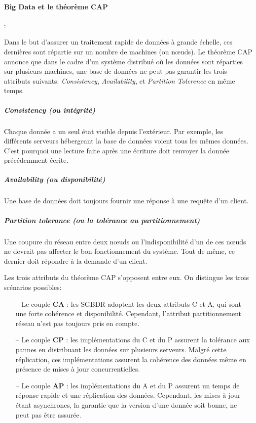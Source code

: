 		\paragraph{Big Data et le théorème  CAP} \label{par:cap-theorem}:
		
		Dans le but d'assurer un traitement rapide de données à grande échelle, ces dernières sont répartie sur un nombre de machines  (ou n\oe{}uds). Le théorème CAP annonce que dans le cadre d'un système distribué où les données sont réparties sur plusieurs machines,
		une base de données ne peut pas garantir les trois attributs suivants: \textit{Consistency}, \textit{Availability}, et \textit{Partition Tolerence}  en même temps. 
		
		
			\subparagraph{ Consistency (ou intégrité)} Chaque donnée a un seul état visible depuis l'extérieur. Par exemple, les différents serveurs hébergeant la base de données voient tous les mêmes données. C'est pourquoi une lecture faite après une écriture doit renvoyer la donnée précédemment écrite.
			
			\subparagraph{ Availability (ou disponibilité)} Une base de données doit toujours fournir une réponse à une requête d'un client.
			
			
			 \subparagraph{Partition tolerance (ou la tolérance au partitionnement) } Une coupure du réseau entre deux n\oe{}uds ou l'indisponibilité d'un de ces n\oe{}uds ne devrait pas affecter le bon fonctionnement du système. Tout de même,  ce dernier doit répondre à la demande d'un client. 

		
		Les trois attributs du théorème CAP s'opposent entre eux. On distingue les trois scénarios possibles:
		
		\begin{itemize}
			\item [--] Le couple \textbf{CA} : les SGBDR adoptent les deux attributs C et A, qui sont une forte cohérence et disponibilité. Cependant, l'attribut partitionnement réseau n'est pas toujours pris en compte.
			\item [--] Le couple \textbf{CP} : les implémentations du C et du P assurent la tolérance aux pannes en distribuant les données sur plusieurs serveurs. Malgré cette réplication, ces implémentations assurent la cohérence des données même en présence de mises à jour concurrentielles.
			\item [--] Le couple \textbf{AP} : les implémentations du A et du  P assurent un temps de réponse rapide et une réplication des données. Cependant, les mises à jour étant asynchrones, la garantie que la version d'une donnée soit bonne, ne peut pas être assurée.
			
		\end{itemize}
		
